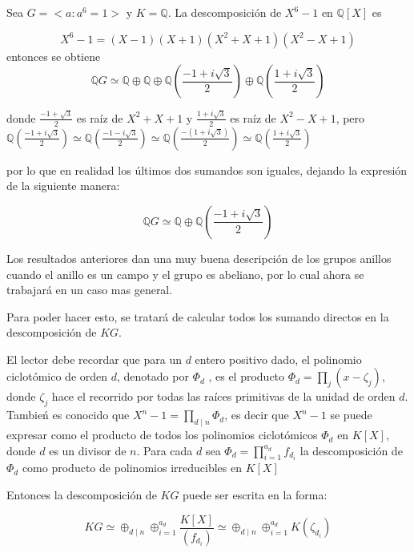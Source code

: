 \begin{ejemplo}
Sea $G = < a \colon a^6 = 1 >$ y $K = \mathds{Q}$. La descomposición de $X^6 - 1 $ en $\mathds{Q}[X]$ es 

\[ X^6 - 1 = (X-1)(X+1)(X^2 + X + 1)(X^2-X+1) \]
entonces se obtiene 
\[  \mathds{Q}G \simeq \mathds{Q} \oplus \mathds{Q} \oplus \mathds{Q}\left( \frac{-1+i\sqrt{3}}{2} \right) \oplus \mathds{Q}\left( \frac{1+i\sqrt{3}}{2} \right)   \]

donde $\frac{-1 + \sqrt{3}}{2}$ es raíz de $X^2+X+1$ y $\frac{1+i\sqrt{3}}{2}$ es raíz de $X^2-X+1$, pero $\mathds{Q}\left( \frac{-1+i\sqrt{3}}{2} \right) \simeq \mathds{Q}\left( \frac{-1-i\sqrt{3}}{2} \right) \simeq \mathds{Q}\left( \frac{-(1+i\sqrt{3})}{2} \right) \simeq \mathds{Q}\left( \frac{1+i\sqrt{3}}{2} \right)$

por lo que en realidad los últimos dos sumandos son iguales, dejando la expresión de la siguiente manera:

\[  \mathds{Q}G \simeq  \mathds{Q} \oplus \mathds{Q}\left( \frac{-1+i\sqrt{3}}{2} \right)   \]





\end{ejemplo}

Los resultados anteriores dan una muy buena descripción de los grupos anillos cuando el anillo es un campo y el grupo es abeliano, por lo cual ahora se trabajará en un caso mas general. 


Para poder hacer esto, se tratará de calcular todos los sumando directos en la descomposición de $KG$.  

El lector debe recordar que para un $d$ entero positivo dado, el polinomio ciclotómico de orden $d$, denotado por $\Phi_d$ , es el producto $\Phi_d = \prod_{j}(x-\zeta_j)$, donde $\zeta_j$ hace el recorrido por todas las raíces primitivas de la unidad de orden $d$. Tambień es conocido que $X^n -1 = \prod_{d\mid n} \Phi_d $, es decir que $X^n -1 $ se puede expresar como el producto de todos los polinomios ciclotómicos $\Phi_d$ en $K[X]$, donde $d$ es un divisor de $n$. Para cada $d$ sea $\Phi_d = \prod_{i=1}^{a_d}f_{d_i}$ la descomposición de $\Phi_d$ como producto de polinomios irreducibles en $K[X]$

Entonces la descomposición de $KG$ puede ser escrita en la forma:

\[ KG \simeq \oplus_{d \mid n} \oplus_{i=1}^{a_d} \frac{K[X]}{(f_{d_i})} \simeq \oplus_{d \mid n} \oplus_{i=1}^{a_d} K(\zeta _{d_i}) \]

